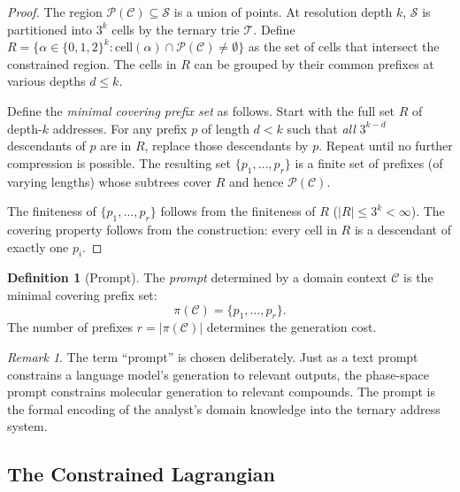 \documentclass[11pt,twocolumn,a4paper]{article}
\theoremstyle{definition}
\newtheorem{definition}[theorem]{Definition}
\theoremstyle{remark}
\newtheorem{remark}[theorem]{Remark}
\newcommand{\Sspace}{\mathcal{S}}
\newcommand{\Trie}{\mathcal{T}}
\newcommand{\Purpose}{\mathcal{P}}
\newcommand{\Context}{\mathcal{C}}
\newcommand{\Prompt}{\pi}
\begin{document}
\begin{proof}
The region $\Purpose(\Context) \subseteq \Sspace$ is a union of points. At resolution depth $k$, $\Sspace$ is partitioned into $3^k$ cells by the ternary trie $\Trie$. Define $R = \{\alpha \in \{0,1,2\}^k : \text{cell}(\alpha) \cap \Purpose(\Context) \neq \emptyset\}$ as the set of cells that intersect the constrained region. The cells in $R$ can be grouped by their common prefixes at various depths $d \leq k$.

Define the \emph{minimal covering prefix set} as follows. Start with the full set $R$ of depth-$k$ addresses. For any prefix $p$ of length $d < k$ such that \emph{all} $3^{k-d}$ descendants of $p$ are in $R$, replace those descendants by $p$. Repeat until no further compression is possible. The resulting set $\{p_1, \ldots, p_r\}$ is a finite set of prefixes (of varying lengths) whose subtrees cover $R$ and hence $\Purpose(\Context)$.

The finiteness of $\{p_1, \ldots, p_r\}$ follows from the finiteness of $R$ ($|R| \leq 3^k < \infty$). The covering property follows from the construction: every cell in $R$ is a descendant of exactly one $p_i$.
\end{proof}

\begin{definition}[Prompt]\label{def:prompt}
The \emph{prompt} determined by a domain context $\Context$ is the minimal covering prefix set:
\begin{equation}\label{eq:prompt}
  \Prompt(\Context) = \{p_1, \ldots, p_r\}.
\end{equation}
The number of prefixes $r = |\Prompt(\Context)|$ determines the generation cost.
\end{definition}

\begin{remark}
The term ``prompt'' is chosen deliberately. Just as a text prompt constrains a language model's generation to relevant outputs, the phase-space prompt constrains molecular generation to relevant compounds. The prompt is the formal encoding of the analyst's domain knowledge into the ternary address system.
\end{remark}

\subsection{The Constrained Lagrangian}\label{sec:constrained-lagrangian}
\end{document}
